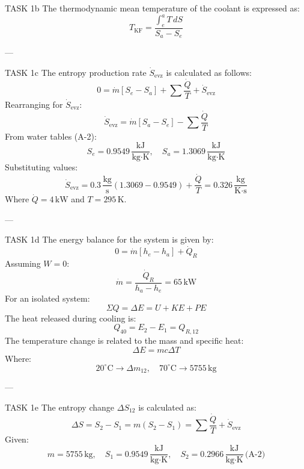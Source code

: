 TASK 1b  
The thermodynamic mean temperature of the coolant is expressed as:  
\[
T_{\text{KF}} = \frac{\int_{e}^{a} T \, dS}{S_a - S_e}
\]

---

TASK 1c  
The entropy production rate \( \dot{S}_{\text{evz}} \) is calculated as follows:  
\[
0 = \dot{m}[S_e - S_a] + \sum \frac{\dot{Q}}{T} + \dot{S}_{\text{evz}}
\]  
Rearranging for \( \dot{S}_{\text{evz}} \):  
\[
\dot{S}_{\text{evz}} = \dot{m}[S_a - S_e] - \sum \frac{\dot{Q}}{T}
\]  
From water tables (A-2):  
\[
S_e = 0.9549 \, \frac{\text{kJ}}{\text{kg·K}}, \quad S_a = 1.3069 \, \frac{\text{kJ}}{\text{kg·K}}
\]  
Substituting values:  
\[
\dot{S}_{\text{evz}} = 0.3 \, \frac{\text{kg}}{\text{s}} \left( 1.3069 - 0.9549 \right) + \frac{\dot{Q}}{T} = 0.326 \, \frac{\text{kg}}{\text{K·s}}
\]  
Where \( \dot{Q} = 4 \, \text{kW} \) and \( T = 295 \, \text{K} \).

---

TASK 1d  
The energy balance for the system is given by:  
\[
0 = \dot{m}[h_e - h_a] + \dot{Q}_R
\]  
Assuming \( W = 0 \):  
\[
\dot{m} = \frac{\dot{Q}_R}{h_a - h_e} = 65 \, \text{kW}
\]  
For an isolated system:  
\[
\Sigma Q = \Delta E = U + KE + PE
\]  
The heat released during cooling is:  
\[
Q_{40} = E_2 - E_1 = Q_{R,12}
\]  
The temperature change is related to the mass and specific heat:  
\[
\Delta E = m c \Delta T
\]  
Where:  
\[
20^\circ\text{C} \to \Delta m_{12}, \quad 70^\circ\text{C} \to 5755 \, \text{kg}
\]

---

TASK 1e  
The entropy change \( \Delta S_{12} \) is calculated as:  
\[
\Delta S = S_2 - S_1 = m(S_2 - S_1) = \sum \frac{\dot{Q}}{T} + \dot{S}_{\text{evz}}
\]  
Given:  
\[
m = 5755 \, \text{kg}, \quad S_1 = 0.9549 \, \frac{\text{kJ}}{\text{kg·K}}, \quad S_2 = 0.2966 \, \frac{\text{kJ}}{\text{kg·K}} \, \text{(A-2)}
\]